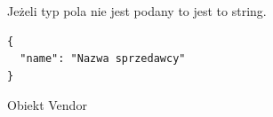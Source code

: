 \begin{figure}[H]
\label{schema:vendor}
Jeżeli typ pola nie jest podany to jest to string.
\begin{verbatim}
{
  "name": "Nazwa sprzedawcy"
}
\end{verbatim}
\caption{Obiekt Vendor}
\end{figure}
